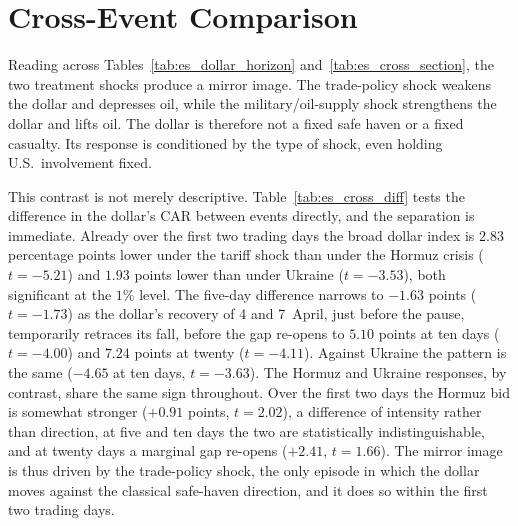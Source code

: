 


\section{Cross-Event Comparison}
\label{sec:es_comparison}

Reading across Tables~\ref{tab:es_dollar_horizon} and~\ref{tab:es_cross_section}, the two treatment shocks produce a mirror image. The trade-policy shock weakens the dollar and depresses oil, while the
military/oil-supply shock strengthens the dollar and lifts oil. The dollar is therefore
not a fixed safe haven or a fixed casualty. Its response is conditioned by the
type of shock, even holding U.S.\ involvement fixed.

This contrast is not merely descriptive. Table~\ref{tab:es_cross_diff} tests the
difference in the dollar's CAR between events directly, and the separation is immediate.
Already over the first two trading days the broad dollar index is $2.83$ percentage points lower
under the tariff shock than under the Hormuz crisis ($t=-5.21$) and $1.93$ points lower
than under Ukraine ($t=-3.53$), both significant at the $1\%$ level. The five-day
difference narrows to $-1.63$ points ($t=-1.73$) as the dollar's recovery of 4 and 7~April, just
before the pause, temporarily retraces its fall, before the gap re-opens to $5.10$ points at ten days
($t=-4.00$) and $7.24$ points at twenty ($t=-4.11$). Against Ukraine the pattern is the
same ($-4.65$ at ten days, $t=-3.63$). The Hormuz and Ukraine responses, by contrast,
share the same sign throughout. Over the first two days the Hormuz bid is somewhat stronger
($+0.91$ points, $t=2.02$), a difference of intensity rather than direction, at five and
ten days the two are statistically indistinguishable, and at twenty days a marginal gap
re-opens ($+2.41$, $t=1.66$). The mirror image is thus driven by
the trade-policy shock, the only episode in which the dollar moves against the
classical safe-haven direction, and it does so within the first two trading days.



